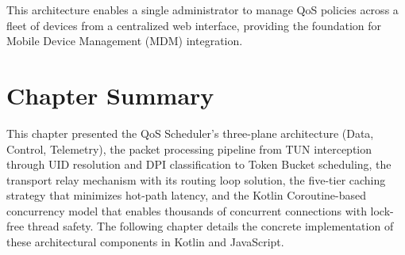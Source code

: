 This architecture enables a single administrator to manage QoS policies across a fleet of devices from a centralized web interface, providing the foundation for Mobile Device Management (MDM) integration.

\section{Chapter Summary}

This chapter presented the QoS Scheduler's three-plane architecture (Data, Control, Telemetry), the packet processing pipeline from TUN interception through UID resolution and DPI classification to Token Bucket scheduling, the transport relay mechanism with its routing loop solution, the five-tier caching strategy that minimizes hot-path latency, and the Kotlin Coroutine-based concurrency model that enables thousands of concurrent connections with lock-free thread safety. The following chapter details the concrete implementation of these architectural components in Kotlin and JavaScript.
